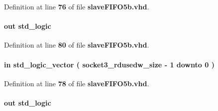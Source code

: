 Definition at line {\bf 76} of file {\bf slave\+F\+I\+F\+O5b.\+vhd}.

\paragraph[{socket3\+\_\+fifo\+\_\+rd}]{ {\bfseries \textcolor{keywordflow}{out}\textcolor{vhdlchar}{ }} {\bfseries \textcolor{comment}{std\+\_\+logic}\textcolor{vhdlchar}{ }} \hspace{0.3cm}{\ttfamily [Port]}}\label{classslaveFIFO5b_a98a4199e7d5f91ab958b8939d852a6d3}


Definition at line {\bf 80} of file {\bf slave\+F\+I\+F\+O5b.\+vhd}.

\paragraph[{socket3\+\_\+fifo\+\_\+rdusedw}]{ {\bfseries \textcolor{keywordflow}{in}\textcolor{vhdlchar}{ }} {\bfseries \textcolor{comment}{std\+\_\+logic\+\_\+vector}\textcolor{vhdlchar}{ }\textcolor{vhdlchar}{(}\textcolor{vhdlchar}{ }\textcolor{vhdlchar}{ }\textcolor{vhdlchar}{ }\textcolor{vhdlchar}{ }{\bfseries {\bf socket3\+\_\+rdusedw\+\_\+size}} \textcolor{vhdlchar}{-\/}\textcolor{vhdlchar}{ } \textcolor{vhdldigit}{1} \textcolor{vhdlchar}{ }\textcolor{keywordflow}{downto}\textcolor{vhdlchar}{ }\textcolor{vhdlchar}{ } \textcolor{vhdldigit}{0} \textcolor{vhdlchar}{ }\textcolor{vhdlchar}{)}\textcolor{vhdlchar}{ }} \hspace{0.3cm}{\ttfamily [Port]}}\label{classslaveFIFO5b_afff948cda8139e0f8cfd81682096d727}


Definition at line {\bf 78} of file {\bf slave\+F\+I\+F\+O5b.\+vhd}.

\paragraph[{socket3\+\_\+fifo\+\_\+wr}]{ {\bfseries \textcolor{keywordflow}{out}\textcolor{vhdlchar}{ }} {\bfseries \textcolor{comment}{std\+\_\+logic}\textcolor{vhdlchar}{ }} \hspace{0.3cm}{\ttfamily [Port]}}\label{classslaveFIFO5b_a1be383ee83b5525811b6d14a41a4b690}


